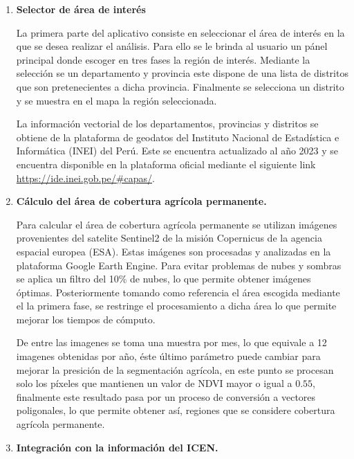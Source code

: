     \begin{enumerate}[label=\thesubsection.\arabic*, leftmargin=1.5cm]
      \item \textbf{Selector de área de interés}
      
      La primera parte del aplicativo consiste en seleccionar el área de interés en la que se desea realizar el análisis. Para ello se le brinda al usuario un pánel principal donde escoger en tres fases la región de interés. Mediante la selección se un departamento y provincia este dispone de una lista de distritos que son pretenecientes a dicha provincia. Finalmente se selecciona un distrito y se muestra en el mapa la región seleccionada.

      La información vectorial de los departamentos, provincias y distritos se obtiene de la plataforma de geodatos del Instituto Nacional de Estadística e Informática (INEI) del Perú. Este se encuentra actualizado al año 2023 y se encuentra disponible en la plataforma oficial mediante el siguiente link \href{https://ide.inei.gob.pe/#capas/}{https://ide.inei.gob.pe/\#capas/}.

      \item \textbf{Cálculo del área de cobertura agrícola permanente.}
      
      Para calcular el área de cobertura agrícola permanente se utilizan imágenes provenientes del satelite Sentinel2 de la misión Copernicus de la agencia espacial europea (ESA). Estas imágenes son procesadas y analizadas en la plataforma Google Earth Engine. Para evitar problemas de nubes y sombras se aplica un filtro del 10\% de nubes, lo que permite obtener imágenes óptimas. Posteriormente tomando como referencia el área escogida mediante el la primera fase, se restringe el procesamiento a dicha área lo que permite mejorar los tiempos de cómputo.

      De entre las imagenes se toma una muestra por mes, lo que equivale a 12 imagenes obtenidas por año, éste último parámetro puede cambiar para mejorar la presición de la segmentación agrícola, en este punto se procesan solo los píxeles que mantienen un valor de NDVI mayor o igual a $0.55$, finalmente este resultado pasa por un proceso de conversión a vectores poligonales, lo que permite obtener así, regiones que se considere cobertura agrícola permanente.

      \item \textbf{Integración con la información del ICEN.}

    \end{enumerate}